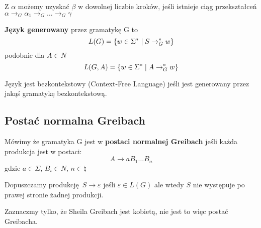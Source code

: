 Z \( \alpha \) możemy uzyskać \( \beta \) w dowolnej liczbie kroków, jeśli istnieje ciąg przekształceń \( \alpha \rightarrow_G \alpha_1 \rightarrow_G \dots \rightarrow_G \gamma \)


\begin{definition}
	\textbf{Język  generowany} przez gramatykę G to
	\[
		L(G) = \set{w \in \Sigma^* \mid S \rightarrow_G^* w}
	\]
	podobnie dla \( A \in N \)
	\[
		L(G, A) = \set{w \in \Sigma^* \mid A \rightarrow_G^* w}
	\]
\end{definition}

\begin{definition}
	Język jest bezkontekstowy (Context-Free Language) jeśli jest generowany przez jakąś gramatykę bezkontekstową.
\end{definition}

\subsection{Postać normalna Greibach}

\begin{definition}
	Mówimy że gramatyka G jest w \textbf{postaci normalnej Greibach} jeśli każda produkcja jest w postaci:
	\[
		A \rightarrow aB_1\dots B_n
	\]
	gdzie \( a \in \Sigma \), \( B_i \in N \), \( n \in \natural \)

	Dopuszczamy produkcję \( S \rightarrow \varepsilon \) jeśli \( \varepsilon \in L(G) \) ale wtedy \( S \) nie występuje po prawej stronie żadnej produkcji.
\end{definition}

Zaznaczmy tylko, że Sheila Greibach jest kobietą, nie jest to więc postać Greibacha.